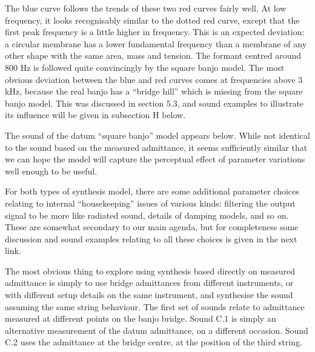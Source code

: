 
  The blue curve follows the trends of these two red curves fairly well. At low 
  frequency, it looks recognisably similar to the dotted red curve, except that 
  the first peak frequency is a little higher in frequency. This is an expected 
  deviation: a circular membrane has a lower fundamental frequency than a 
  membrane of any other shape with the same area, mass and tension. The formant 
  centred around 800 Hz is followed quite convincingly by the square banjo 
  model. The most obvious deviation between the blue and red curves comes at 
  frequencies above 3 kHz, because the real banjo has a ``bridge hill'' which 
  is missing from the square banjo model. This was discussed in section 5.3, 
  and sound examples to illustrate its influence will be given in subsection H 
  below. 

  The sound of the datum ``square banjo'' model appears below. While not 
  identical to the sound based on the measured admittance, it seems 
  sufficiently similar that we can hope the model will capture the perceptual 
  effect of parameter variations well enough to be useful. 

  For both types of synthesis model, there are some additional parameter 
  choices relating to internal ``housekeeping'' issues of various kinds: 
  filtering the output signal to be more like radiated sound, details of 
  damping models, and so on. These are somewhat secondary to our main agenda, 
  but for completeness some discussion and sound examples relating to all these 
  choices is given in the next link. 


  The most obvious thing to explore using synthesis based directly on measured 
  admittance is simply to use bridge admittances from different instruments, or 
  with different setup details on the same instrument, and synthesise the sound 
  assuming the same string behaviour. The first set of sounds relate to 
  admittance measured at different points on the banjo bridge. Sound C.1 is 
  simply an alternative measurement of the datum admittance, on a different 
  occasion. Sound C.2 uses the admittance at the bridge centre, at the position 
  of the third string. 

